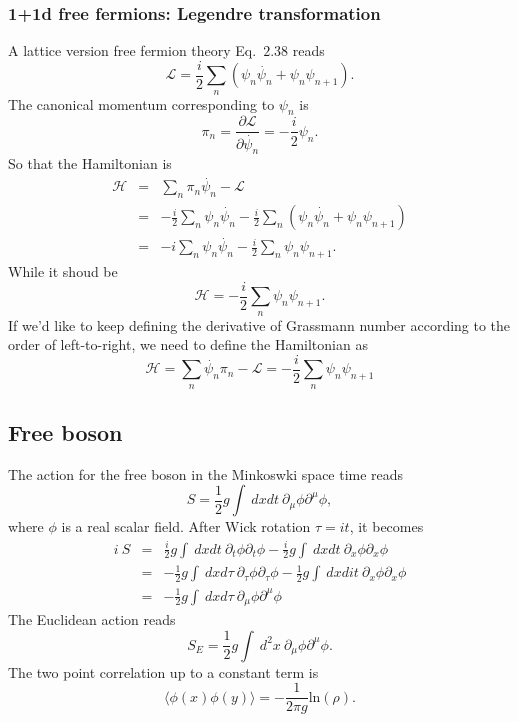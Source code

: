 \documentclass[submission, PhysLectNotes]{SciPost}
\begin{document}
\subsubsection{1+1d free fermions: Legendre transformation}
A lattice version free fermion theory Eq.~$2.38$ reads
\begin{equation}
    \mathcal{L} = \frac{i}{2} \sum_n \left( \psi_n \dot{\psi_n} + \psi_n \psi_{n+1}\right).
\end{equation}
The canonical momentum corresponding to $\psi_n$ is 
\begin{equation}
    \pi_n = \frac{\partial \mathcal{L}}{\partial \dot{\psi_n}} = -\frac{i}{2}\psi_n.
\end{equation}
So that the Hamiltonian is 
\begin{eqnarray}
    \mathcal{H} &=& \sum_n \pi_n \dot{\psi_n} - \mathcal{L} \nonumber\\
      &=& -\frac{i}{2}\sum_n\psi_n \dot{\psi_n} - \frac{i}{2} \sum_n \left( \psi_n \dot{\psi_n} + \psi_n \psi_{n+1}\right) \\
      &=& -i \sum_n\psi_n \dot{\psi_n} - \frac{i}{2} \sum_n \psi_n \psi_{n+1} \nonumber.
\end{eqnarray}
While it shoud be 
\begin{equation}
    \mathcal{H} = -\frac{i}{2}\sum_n\psi_n \psi_{n+1}.
\end{equation}
If we'd like to keep defining the derivative of Grassmann number according to the order of left-to-right, we need to define the Hamiltonian as
\begin{equation}
    \mathcal{H} = \sum_n \dot{\psi_n} \pi_n - \mathcal{L} =  - \frac{i}{2} \sum_n \psi_n \psi_{n+1}
\end{equation}

\subsection{Free boson}
The action for the free boson in the Minkoswki space time reads
\begin{equation}
    S = \frac{1}{2}g\int \ dxdt \ \partial_\mu \phi \partial^\mu \phi,
\end{equation}
where $\phi$ is a real scalar field. After Wick rotation $\tau = it$, it becomes
\begin{eqnarray}
    i\ S &=& \frac{i}{2}g\int \ dxdt \ \partial_t \phi \partial_t \phi - \frac{i}{2}g\int \ dxdt \ \partial_x \phi \partial_x \phi \nonumber \\
    &=& -\frac{1}{2}g\int \ dxd\tau \ \partial_\tau \phi \partial_\tau \phi - \frac{1}{2}g\int \ dxdit \ \partial_x \phi \partial_x \phi \nonumber \\
    &=& -\frac{1}{2}g\int \ dxd\tau \ \partial_\mu \phi \partial^\mu \phi
\end{eqnarray}
The Euclidean action reads
\begin{equation}
    S_E = \frac{1}{2}g\int \ d^2x \ \partial_\mu \phi \partial^\mu \phi.
\end{equation}
The two point correlation up to a constant term is
\begin{equation}
    \langle \phi(x) \phi(y) \rangle = -\frac{1}{2\pi g} \mathrm{ln} (\rho).
\end{equation}
\end{document}
